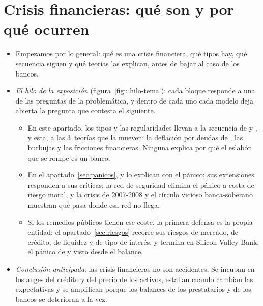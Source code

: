 \documentclass[11pt]{article}
\begin{document}
\section{Crisis financieras: qué son y por qué ocurren}\label{sec:crisis}

\begin{itemize}
\item Empezamos por lo general: qué es una crisis financiera, qué tipos hay, qué secuencia siguen y qué teorías las explican, antes de bajar al caso de los bancos.
\item \emph{El hilo de la exposición} (figura~\ref{figu:hilo-tema}): cada bloque responde a una de las preguntas de la problemática, y dentro de cada uno cada modelo deja abierta la pregunta que contesta el siguiente.
  \begin{itemize}
  \item En este apartado, los tipos y las regularidades llevan a la secuencia de  y , y esta, a las 3~teorías que la mueven: la deflación por deudas de , las burbujas y las fricciones financieras. Ninguna explica por qué el eslabón que se rompe es un banco.
  \item En el apartado~\ref{sec:panicos},  y  lo explican con el pánico; sus extensiones responden a sus críticas; la red de seguridad elimina el pánico a costa de riesgo moral, y la crisis de 2007-2008 y el círculo vicioso banca-soberano muestran qué pasa donde esa red no llega.
  \item Si los remedios públicos tienen ese coste, la primera defensa es la propia entidad: el apartado~\ref{sec:riesgos} recorre sus riesgos de mercado, de crédito, de liquidez y de tipo de interés, y termina en Silicon Valley Bank, el pánico de  y  visto desde el balance.
  \end{itemize}
\item \emph{Conclusión anticipada}: las crisis financieras no son accidentes. Se incuban en los auges del crédito y del precio de los activos, estallan cuando cambian las expectativas y se amplifican porque los balances de los prestatarios y de los bancos se deterioran a la vez.
\end{itemize}

\begin{infografia}[p]
\centering
\caption{El hilo conductor del tema: qué responde cada modelo y qué lleva al siguiente}\label{figu:hilo-tema}
\end{infografia}
\end{document}
